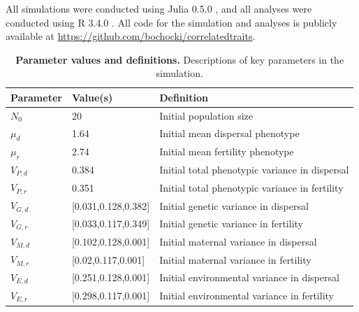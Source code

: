 \documentclass[11pt]{article}
\begin{document}
All simulations were conducted using Julia 0.5.0 \citep{bezanson_julia:_2017}, and all analyses were conducted using R 3.4.0 \citep{r_core_team_r:_2015}.
All code for the simulation and analyses is publicly available at \url{https://github.com/bochocki/correlatedtraits}.
\renewcommand{\thetable}{A\arabic{table}}
\setcounter{table}{0}
\begin{table}[h]
\centering
\label{Parameter values and definitions}
\caption[Parameter values and definitions]{\textbf{Parameter values and definitions.} Descriptions of key parameters in the simulation.}\label{corr:params}\vspace{0.1in}
\begin{tabularx}{0.95\linewidth}{llX}
\toprule
Parameter    & Value(s)                               & Definition                                        \\ \midrule
$N_{0}$      & 20                                     & Initial population size                           \\
$\mu_{d}$    & 1.64                                   & Initial mean dispersal phenotype   \\
$\mu_{r}$    & 2.74                                   & Initial mean fertility phenotype
\\
$V_{P,d}$    & 0.384                                   & Initial total phenotypic variance in dispersal \\
$V_{P,r}$    & 0.351                                   & Initial total phenotypic variance in fertility \\
$V_{G,d}$    & [0.031,0.128,0.382]                     & Initial genetic variance in dispersal \\
$V_{G,r}$    & [0.033,0.117,0.349]                     & Initial genetic variance in fertility \\
$V_{M,d}$    & [0.102,0.128,0.001]                     & Initial maternal variance in dispersal \\
$V_{M,r}$    & [0.02,0.117,0.001]                                  & Initial maternal variance in fertility \\
$V_{E,d}$    & [0.251,0.128,0.001]                                  & Initial environmental variance in dispersal \\
$V_{E,r}$    & [0.298,0.117,0.001]                                  & Initial environmental variance in fertility \\


\end{tabularx}
\end{table}
\end{document}
